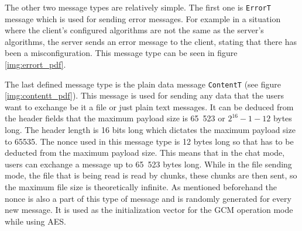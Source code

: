 The other two message types are relatively simple. The first one is \texttt{ErrorT} message which is used for sending error messages. For example in a situation where the client's configured algorithms are not the same as the server's algorithms, the server sends an error message to the client, stating that there has been a misconfiguration. This message type can be seen in figure \ref{img:errort_pdf}.

The last defined message type is the plain data message \texttt{ContentT} (see figure \ref{img:contentt_pdf}). This message is used for sending any data that the users want to exchange be it a file or just plain text messages. It can be deduced from the header fields that the maximum payload size is 65~523 or $2^{16}-1-12$ bytes long. The header length is 16 bits long which dictates the maximum payload size to 65535. The nonce used in this message type is 12 bytes long so that has to be deducted from the maximum payload size. This means that in the chat mode, users can exchange a message up to 65~523 bytes long. While in the file sending mode, the file that is being read is read by chunks, these chunks are then sent, so the maximum file size is theoretically infinite. As mentioned beforehand the nonce is also a part of this type of message and is randomly generated for every new message. It is used as the initialization vector for the GCM operation mode while using AES.

